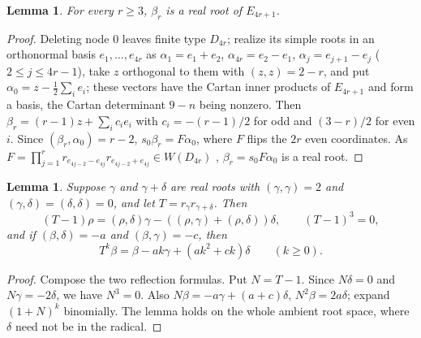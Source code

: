 \documentclass[10pt]{article}
\newtheorem{lemma}[theorem]{Lemma}
\theoremstyle{remark}
\begin{document}
\begin{lemma}\label{lem:uniformseed}
For every $r\geq3$, $\beta_r$ is a real root of $E_{4r+1}$.
\end{lemma}
\begin{proof}
Deleting node $0$ leaves finite type $D_{4r}$; realize its simple roots in
an orthonormal basis $e_1,\ldots,e_{4r}$ as $\alpha_1=e_1+e_2$,
$\alpha_{4r}=e_2-e_1$, $\alpha_j=e_{j+1}-e_j$ ($2\leq j\leq4r-1$), take $z$
orthogonal to them with $(z,z)=2-r$, and put
$\alpha_0=z-\frac12\sum_ie_i$; these vectors have the Cartan inner
products of $E_{4r+1}$ and form a basis, the Cartan determinant $9-n$
being nonzero. Then $\beta_r=(r-1)z+\sum_ic_ie_i$ with $c_i=-(r-1)/2$ for
odd and $(3-r)/2$ for even $i$. Since $(\beta_r,\alpha_0)=r-2$,
$s_0\beta_r=F\alpha_0$, where $F$ flips the $2r$ even coordinates. As
$F=\prod_{j=1}^r r_{e_{4j-2}-e_{4j}}r_{e_{4j-2}+e_{4j}}\in W(D_{4r})$
\cite[Example~1.1.6]{Gern}, $\beta_r=s_0F\alpha_0$ is a real root.
\end{proof}

\begin{lemma}\label{lem:rootaction}
Suppose $\gamma$ and $\gamma+\delta$ are real roots with
$(\gamma,\gamma)=2$ and $(\gamma,\delta)=(\delta,\delta)=0$, and let
$T=r_\gamma r_{\gamma+\delta}$. Then
\[
 (T-1)\rho=(\rho,\delta)\gamma-((\rho,\gamma)+(\rho,\delta))\delta,
 \qquad(T-1)^3=0,
\]
and if $(\beta,\delta)=-a$ and $(\beta,\gamma)=-c$, then
\begin{equation}\label{eq:rootiterate}
 T^k\beta=\beta-ak\gamma+(ak^2+ck)\delta\qquad(k\geq0).
\end{equation}
\end{lemma}
\begin{proof}
Compose the two reflection formulas. Put $N=T-1$. Since $N\delta=0$ and
$N\gamma=-2\delta$, we have $N^3=0$. Also $N\beta=-a\gamma+(a+c)\delta$,
$N^2\beta=2a\delta$; expand $(1+N)^k$ binomially. The lemma holds on the
whole ambient root space, where $\delta$ need not be in the radical.
\end{proof}
\end{document}
